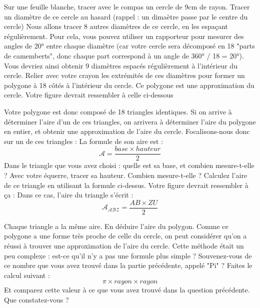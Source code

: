 \documentclass{exam}
\begin{document}
\begin{questions}
  \question Sur une feuille blanche, tracer avec le compas un cercle de 9cm de rayon.
  \question Tracer un diamètre de ce cercle au hasard (rappel : un dimaètre passe par le centre du cercle)
  \question Nous allons tracer 8 autres diamètres de ce cercle, en les espaçant régulièrement. Pour cela, vous pouvez utiliser un rapporteur pour mesurer des angles de 20° entre chaque diamètre (car votre cercle sera décomposé en 18 "parts de camemberts", donc chaque part correspond à un angle de 360° / 18 = 20°). Vous devriez ainsi obtenir 9 diamètres espacés régulièrement à l'intérieur du cercle.
  \question Relier avec votre crayon les extrémités de ces diamètres pour former un polygone à 18 côtés à l'intérieur du cercle. Ce polygone est une approximation du cercle. Votre figure devrait ressembler à celle ci-dessous

  \question Votre polygone est donc composé de 18 triangles identiques. Si on arrive à déterminer l'aire d'un de ces triangles, on arrivera à déterminer l'aire du polygone en entier, et obtenir une approximation de l'aire du cercle. Focalisons-nous donc sur un de ces triangles :
  La formule de son aire est : 
 \[
 \mathcal{A} = \frac{base \times hauteur}{2}
 \] 
  Dans le triangle que vous avez choisi : quelle est sa base, et combien mesure-t-elle ? Avec votre équerre, tracer sa hauteur. Combien mesure-t-elle ? Calculez l'aire de ce triangle en utilisant la formule ci-dessus. Votre figure devrait ressembler à ça : 
  Dans ce cas, l'aire du triangle s'écrit : 
 \[
 \mathcal{A_\text{ABZ}} = \frac{AB \times ZU}{2}
 \] 

  \question Chaque triangle a la même aire. En déduire l'aire du polygon. Comme ce polygone a une forme très proche de celle du cercle, on peut considérer qu'on a réussi à trouver une approximation de l'aire du cercle.
  \question Cette méthode était un peu complexe : est-ce qu'il n'y a pas une formule plus simple ? Souvenez-vous de ce nombre que vous avez trouvé dans la partie précédente, appelé "Pi" ? Faites le calcul suivant : 
  \[
   \pi \times rayon \times rayon
  \]
  Et comparez cette valeur à ce que vous avez trouvé dans la question précédente. Que constatez-vous ?
\end{questions}
\end{document}
